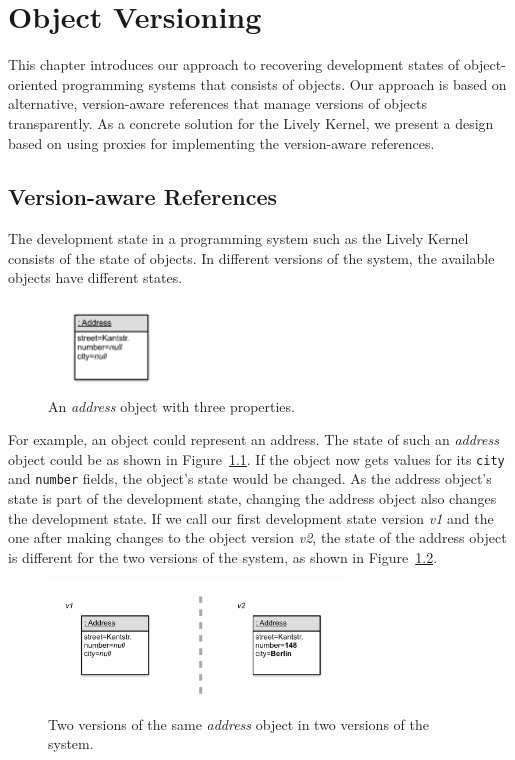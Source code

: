 \chapter{Object Versioning} \label{chapter:APPROACH}

This chapter introduces our approach to recovering development states of object-oriented programming systems that consists of objects.
Our approach is based on alternative, version-aware references that manage versions of objects transparently.
As a concrete solution for the Lively Kernel, we present a design based on using proxies for implementing the version-aware references.


\section{Version-aware References} \label{sec:APPROACH:1}

The development state in a programming system such as the Lively Kernel consists of the state of objects.
In different versions of the system, the available objects have different states. 

\begin{figure}[h]
    \centering
    \includegraphics[width=0.3\textwidth]{figures/4_approach/1_singleObject.pdf}
    \caption{An \emph{address} object with three properties.}
    \label{fig:SingleObject}
\end{figure}

For example, an object could represent an address.
The state of such an \emph{address} object could be as shown in Figure~\ref{fig:SingleObject}.
If the object now gets values for its \lstinline{city} and \lstinline{number} fields, the object's state would be changed.
As the address object's state is part of the development state, changing the address object also changes the development state.
If we call our first development state version \emph{v1} and the one after making changes to the object version \emph{v2}, the state of the address object is different for the two versions of the system, as shown in Figure~\ref{fig:ObjectChanged}.

\begin{figure}[h]
    \centering
    \includegraphics[width=0.7\textwidth]{figures/4_approach/2_objectChange.pdf}
    \caption{Two versions of the same \emph{address} object in two versions of the system.}
    \label{fig:ObjectChanged}
\end{figure}


